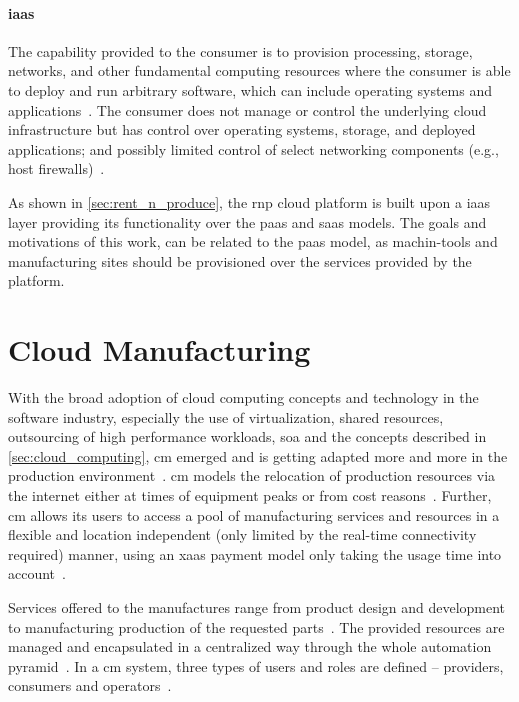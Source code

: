 \documentclass[
a4paper,
twoside,
headsepline,
cleardoublepage=empty,
parskip=half,
draft=false
]{scrbook}
\begin{document}
			\paragraph{\gls{iaas}} The capability provided to the consumer is to provision processing, storage, networks, and other fundamental computing resources where the consumer is able to deploy and run arbitrary software, which can include operating systems and applications~\cite{leymann2011cloud}. The consumer does not manage or control the underlying cloud infrastructure but has control over operating systems, storage, and deployed applications; and possibly limited control of select networking components (e.g., host firewalls)~\cite{mell2011nist}.

			As shown in \cref{sec:rent_n_produce}, the \gls{rnp} cloud platform is built upon a \gls{iaas} layer providing its functionality over the \gls{paas} and \gls{saas} models. The goals and motivations of this work, can be related to the \gls{paas} model, as machin-tools and manufacturing sites should be provisioned over the services provided by the platform.

	\newpage

		\section{Cloud Manufacturing}\label{sec:cloud_manufacturing}

			With the broad adoption of cloud computing concepts and technology in the software industry, especially the use of virtualization, shared resources, outsourcing of high performance workloads, \gls{soa} and the concepts described in \cref{sec:cloud_computing}, \gls{cm} emerged and is getting adapted more and more in the production environment~\cite{he2015state}. \gls{cm} models the relocation of production resources via the internet either at times of equipment peaks or from cost reasons~\cite{wu2013cloud}. Further, \gls{cm} allows its users to access a pool of manufacturing services and resources in a flexible and location independent (only limited by the real-time connectivity required) manner, using an \gls{xaas} payment model only taking the usage time into account~\cite{macia2012cloud}.

			Services offered to the manufactures range from product design and development to manufacturing production of the requested parts~\cite{xu2012cloud}. The provided resources  are managed and encapsulated in a centralized way through the whole automation pyramid~\cite{kleinemeier2014automatisierungspyramide}.
			In a \gls{cm} system, three types of users and roles are defined -- providers, consumers and operators~\cite{wu2013cloud}.
\end{document}
